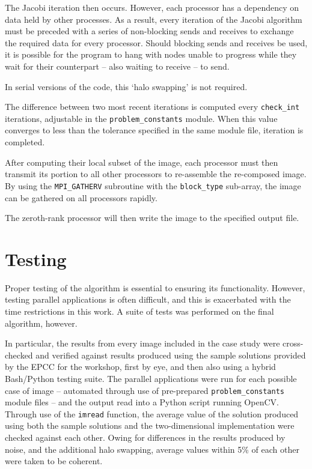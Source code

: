\documentclass{article} %
\begin{document}
The Jacobi iteration then occurs. 
However, each processor has a dependency on data held by other processes. As a result, every iteration of the Jacobi algorithm must be preceded with a series of non-blocking sends and receives to exchange the required data for every processor. Should blocking sends and receives be used, it is possible for the program to hang with nodes unable to progress while they wait for their counterpart -- also waiting to receive -- to send.

In serial versions of the code, this `halo swapping' is not required.

The difference between two most recent iterations is computed every \texttt{check\_int} iterations, adjustable in the \texttt{problem\_constants} module. 
When this value converges to less than the tolerance specified in the same module file, iteration is completed.

After computing their local subset of the image, each processor must then transmit its portion to all other processors to re-assemble the re-composed image.
By using the \texttt{MPI\_GATHERV} subroutine with the \texttt{block\_type} sub-array, the image can be gathered on all processors rapidly.

The zeroth-rank processor will then write the image to the specified output file.

\section*{Testing}

Proper testing of the algorithm is essential to ensuring its functionality.
However, testing parallel applications is often difficult, and this is exacerbated with the time restrictions in this work. 
A suite of tests was performed on the final algorithm, however.

In particular, the results from every image included in the case study were cross-checked and verified against results produced using the sample solutions provided by the EPCC for the workshop, first by eye, and then also using a hybrid Bash/Python testing suite.
The parallel applications were run for each possible case of image -- automated through use of pre-prepared \texttt{problem\_constants} module files -- and the output read into a Python script running OpenCV.
Through use of the \texttt{imread} function, the average value of the solution produced using both the sample solutions and the two-dimensional implementation were checked against each other.
Owing for differences in the results produced by noise, and the additional halo swapping, average values within 5\% of each other were taken to be coherent.
\end{document}
